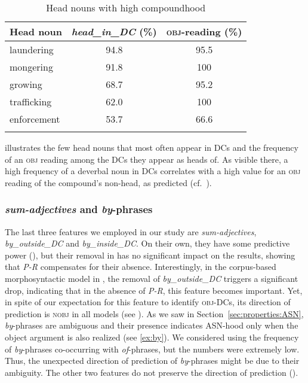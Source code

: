 \documentclass[output=paper]{langsci/langscibook}
\begin{document}
\begin{table}
\caption{\label{tab:compoundhood:ex}Head nouns with high compoundhood}
\begin{tabular}{lSS}
\lsptoprule
Head noun& {\textit{head\_in\_DC} (\%)}& {\textsc{obj}-reading (\%)}\\
\midrule
laundering&94.8&95.5\\
mongering&91.8&100\\
growing&68.7 &95.2\\
trafficking&62.0&100\\
enforcement&53.7&66.6\\
\lspbottomrule
\end{tabular}
\end{table}

 illustrates the few head nouns that most often appear in DCs and the frequency of an \textsc{obj} reading among the DCs they appear as heads of. As visible there, a high frequency of a deverbal noun in DCs correlates with a high value for an \textsc{obj} reading of the compound's non-head, as predicted (cf.~). 

\subsubsection{\textit{sum-adjectives} and \textit{by}-phrases}\label{sec:gia:discussion-int-by}
The last three features we employed in our study are \textit{sum-adjectives},  \textit{by\_outside\_\linebreak DC} and  \textit{by\_inside\_DC}. On their own, they have some predictive power (),  {but their removal in  has no significant impact on the results, showing that \textit{P-R} compensates for their absence. Interestingly, in the corpus-based morphosyntactic model in  , the removal of \textit{by\_outside\_DC} triggers a significant drop, indicating that in the absence of \textit{P-R}, this feature becomes important. Yet, in spite of our expectation for this feature to identify \textsc{obj}-DCs, its direction of prediction is \textsc{nobj} in all models (see ). As we saw in Section~\ref{sec:properties:ASN}, \textit{by}-phrases are ambiguous and their presence indicates ASN-hood only when the object argument is also realized (see \ref{ex:by}). We considered using the frequency of  \textit{by}-phrases co-occurring with \textit{of}-phrases, but the numbers were extremely low. Thus, the unexpected direction of prediction of \textit{by}-phrases might be due to their ambiguity. The other two features do not preserve the direction of prediction ().}
\end{document}
